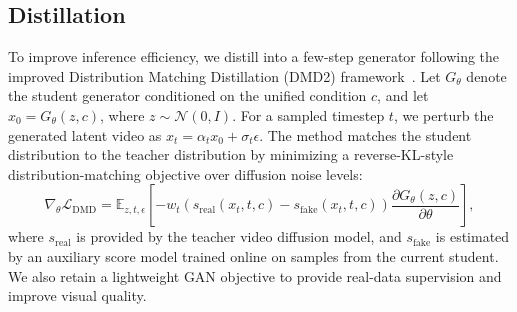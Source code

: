 \subsection{Distillation}
To improve inference efficiency, we distill \method into a few-step generator following the improved Distribution Matching Distillation (DMD2) framework~\cite{yin2024improved}. Let $G_{\theta}$ denote the student generator conditioned on the unified condition $c$, and let $x_0 = G_{\theta}(z,c)$, where $z \sim \mathcal{N}(0,I)$. For a sampled timestep $t$, we perturb the generated latent video as $x_t = \alpha_t x_0 + \sigma_t \epsilon$. The method matches the student distribution to the teacher distribution by minimizing a reverse-KL-style distribution-matching objective over diffusion noise levels:
\begin{equation}
\nabla_{\theta}\mathcal{L}_{\mathrm{DMD}}
=
\mathbb{E}_{z,t,\epsilon}
\left[
-w_t
\left(
s_{\mathrm{real}}(x_t,t,c)-s_{\mathrm{fake}}(x_t,t,c)
\right)
\frac{\partial G_{\theta}(z,c)}{\partial \theta}
\right],
\end{equation}
where $s_{\mathrm{real}}$ is provided by the teacher video diffusion model, and $s_{\mathrm{fake}}$ is estimated by an auxiliary score model trained online on samples from the current student. We also retain a lightweight GAN objective to provide real-data supervision and improve visual quality.